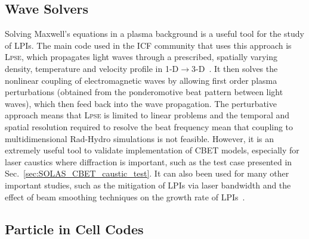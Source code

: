 \subsection{Wave Solvers}

Solving Maxwell's equations in a plasma background is a useful tool for the study of \ac{LPIs}.
The main code used in the \ac{ICF} community that uses this approach is \textsc{Lpse}, which propagates light waves through a prescribed, spatially varying density, temperature and velocity profile in 1-D$\rightarrow$3-D~\cite{myatt_wave-based_2017,myatt_lpse_2019}.
It then solves the nonlinear coupling of electromagnetic waves by allowing first order plasma perturbations (obtained from the ponderomotive beat pattern between light waves), which then feed back into the wave propagation.
The perturbative approach means that \textsc{Lpse} is limited to linear problems and the temporal and spatial resolution required to resolve the beat frequency mean that coupling to multidimensional \ac{Rad-Hydro} simulations is not feasible.
However, it is an extremely useful tool to validate implementation of \ac{CBET} models, especially for laser caustics where diffraction is important, such as the test case presented in Sec.~\ref{sec:SOLAS_CBET_caustic_test}.
It can also been used for many other important studies, such as the mitigation of \ac{LPIs} via laser bandwidth and the effect of beam smoothing techniques on the growth rate of \ac{LPIs}~\cite{follett_thresholds_2021}.

\subsection{Particle in Cell Codes}

